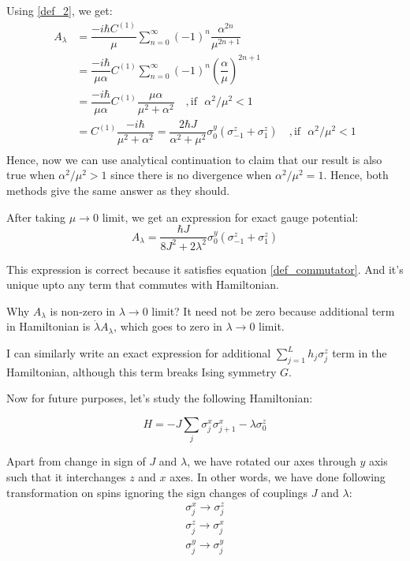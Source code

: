 \documentclass[11pt,a4paper]{article}
\begin{document}
Using \ref{def_2}, we get: %
\begin{align*}
A_{\lambda} &=  \dfrac{-i \hbar   C^{(1)}}{\mu}\sum_{n=0}^{\infty}   (-1)^{n} \dfrac{ \alpha^{2n}}{\mu^{2n+1}} \\
&=  \dfrac{-i \hbar }{\mu \alpha}  C^{(1)}\sum_{n=0}^{\infty}   (-1)^{n} \left(\dfrac{ \alpha}{\mu} \right)^{2n+1} \\
&=  \dfrac{-i \hbar }{\mu \alpha}  C^{(1)} \dfrac{\mu \alpha}{ \mu^2 + \alpha^2}\quad, \mbox{if ~}\alpha^2 / \mu^2 <1 \\
&=    C^{(1)}  \dfrac{ -i\hbar  }{ \mu^2 + \alpha^2}= \dfrac{2 \hbar J}{{\alpha^2 + \mu^2}} \sigma_0^y ( \sigma_{-1}^z + \sigma_1^z) \quad, \mbox{if ~} \alpha^2 / \mu^2 <1 \\
\end{align*}
Hence, now we can use analytical continuation to claim that our result is also true when $\alpha^2 / \mu^2 >1$ since there is no divergence when $\alpha^2 / \mu^2 =1$. Hence, both methods give the same answer as they should.

After taking $\mu \rightarrow 0$ limit, we get an expression for exact gauge potential:
\begin{equation}
\boxed{ A_{\lambda} = \dfrac{\hbar J}{{8 J^2 + 2 \lambda ^2 }} \sigma_0^y ( \sigma_{-1}^z + \sigma_1^z)}
\end{equation}

This expression is correct because it satisfies equation \ref{def_commutator}. And it's unique upto any term that commutes with Hamiltonian.



Why $A_{\lambda}$ is non-zero in $\lambda \rightarrow 0$ limit? It need not be zero because additional term in Hamiltonian is $\dot{\lambda} A_{\lambda}$, which goes to zero in $\lambda \rightarrow 0$ limit. 

I can similarly write an exact expression for additional $\sum_{j=1}^L h_j \sigma_j^z$ term in the Hamiltonian, although this term breaks Ising symmetry $G$.


Now for future purposes, let's study the following Hamiltonian:

\begin{equation}
H= -J \sum_{j}  \sigma_j^x \sigma_{j+1}^x -  \lambda  \sigma_0^z
\label{xx}
\end{equation}

Apart from change in sign of $J$ and $\lambda$, we have rotated our axes through $y$ axis such that it interchanges $z$ and $x$ axes. In other words, we have done following transformation on spins ignoring the sign changes of couplings $J$ and $\lambda$:
\begin{align*}
\sigma_j^x \rightarrow \sigma_j^z \\
\sigma_j^z \rightarrow  \sigma_j^x \\
\sigma_j^y \rightarrow \sigma_j^y
\end{align*}
\end{document}

